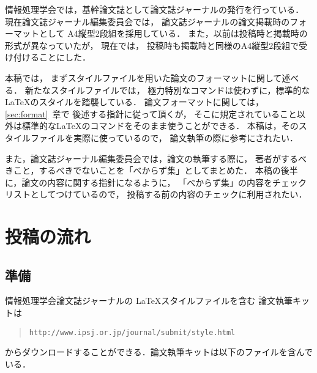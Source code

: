 \documentclass[submit]{ipsj}
\def\|{\verb|}
\begin{document}
情報処理学会では，基幹論文誌として論文誌ジャーナルの発行を行っている．
現在論文誌ジャーナル編集委員会では，
論文誌ジャーナルの論文掲載時のフォーマットとして
A4縦型2段組を採用している．
また，以前は投稿時と掲載時の形式が異なっていたが，
現在では，
投稿時も掲載時と同様のA4縦型2段組で受け付けることにした．



本稿では，
まずスタイルファイルを用いた論文のフォーマットに関して述べる．
新たなスタイルファイルでは，
極力特別なコマンドは使わずに，標準的な \LaTeX のスタイルを踏襲している．
論文フォーマットに関しては，\ref{sec:format}~章で
後述する指針に従って頂くが，
そこに規定されていること以外は標準的な\LaTeX のコマンドをそのまま使うことができる．
本稿は，そのスタイルファイルを実際に使っているので，
論文執筆の際に参考にされたい．





また，論文誌ジャーナル編集委員会では，論文の執筆する際に，
著者がするべきこと，するべきでないことを「べからず集」としてまとめた．
本稿の後半に，論文の内容に関する指針になるように，
「べからず集」の内容をチェックリストとしてつけているので，
投稿する前の内容のチェックに利用されたい．




%2
\section{投稿の流れ}


%2.1
\subsection{準備}


情報処理学会論文誌ジャーナルの \LaTeX スタイルファイルを含む
論文執筆キットは
\begin{quote}
\small
\|http://www.ipsj.or.jp/journal/submit/style.html|
\end{quote}
からダウンロードすることができる．論文執筆キットは以下のファイルを含んでいる．
\end{document}
